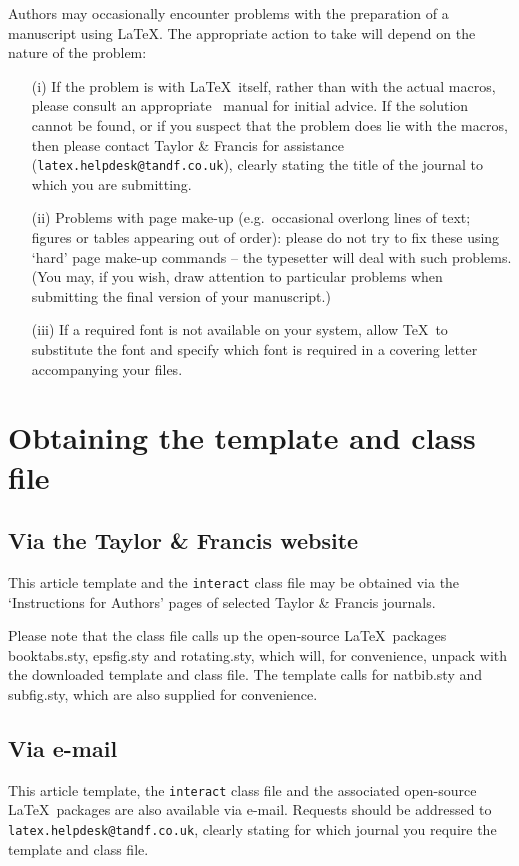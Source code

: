 \documentclass[]{interact}
\theoremstyle{plain}%
\theoremstyle{definition}
\theoremstyle{remark}
\begin{document}
Authors may occasionally encounter problems with the preparation of a manuscript using \LaTeX. The appropriate action to take will depend on the nature of the problem:
\begin{enumerate}
\item[(i)] If the problem is with \LaTeX\ itself, rather than with the actual macros, please consult an appropriate \LaTeXe\ manual for initial advice. If the solution cannot be found, or if you suspect that the problem does lie with the macros, then please contact Taylor \& Francis for assistance (\texttt{latex.helpdesk@tandf.co.uk}), clearly stating the title of the journal to which you are submitting.
\item[(ii)] Problems with page make-up (e.g.\ occasional overlong lines of text; figures or tables appearing out of order): please do not try to fix these using `hard' page make-up commands -- the typesetter will deal with such problems. (You may, if you wish, draw attention to particular problems when submitting the final version of your manuscript.)
\item[(iii)] If a required font is not available on your system, allow \TeX\ to substitute the font and specify which font is required in a covering letter accompanying your files.
\end{enumerate}


\section{Obtaining the template and class file}

\subsection{Via the Taylor \& Francis website}

This article template and the \texttt{interact} class file may be obtained via the `Instructions for Authors' pages of selected Taylor \& Francis journals.

Please note that the class file calls up the open-source \LaTeX\ packages booktabs.sty, epsfig.sty and rotating.sty, which will, for convenience, unpack with the downloaded template and class file. The template calls for natbib.sty and subfig.sty, which are also supplied for convenience.


\subsection{Via e-mail}

This article template, the \texttt{interact} class file and the associated open-source \LaTeX\ packages are also available via e-mail. Requests should be addressed to \texttt{latex.helpdesk@tandf.co.uk}, clearly stating for which journal you require the template and class file.
\end{document}
